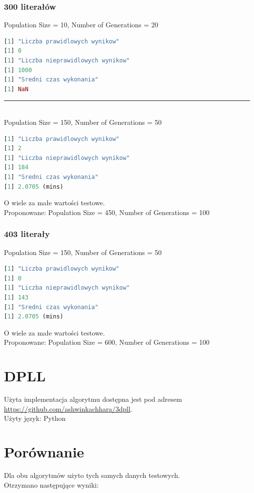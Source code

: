 \documentclass[11pt]{article}
\theoremstyle{note}
\begin{document}
\newpage
\subsubsection{300 literałów}
Population Size = 10, Number of Generations = 20
\begin{lstlisting}[language=R]
[1] "Liczba prawidlowych wynikow"
[1] 0
[1] "Liczba nieprawidlowych wynikow"
[1] 1000
[1] "Sredni czas wykonania"
[1] NaN
\end{lstlisting}
\noindent\rule{13cm}{0.4pt}\\
Population Size = 150, Number of Generations = 50
\begin{lstlisting}[language=R]
[1] "Liczba prawidlowych wynikow"
[1] 2
[1] "Liczba nieprawidlowych wynikow"
[1] 184
[1] "Sredni czas wykonania"
[1] 2.0705 (mins)
\end{lstlisting}
O wiele za małe wartości testowe. \\
Proponowane: Population Size = 450, Number of Generations = 100

\subsubsection{403 literały}
Population Size = 150, Number of Generations = 50
\begin{lstlisting}[language=R]
[1] "Liczba prawidlowych wynikow"
[1] 0
[1] "Liczba nieprawidlowych wynikow"
[1] 143
[1] "Sredni czas wykonania"
[1] 2.0705 (mins)
\end{lstlisting}
O wiele za małe wartości testowe. \\
Proponowane: Population Size = 600, Number of Generations = 100



\newpage
\section{DPLL}
Użyta implementacja algorytmu dostępna jest pod adresem \\\url{https://github.com/ashwinkachhara/3dpll}. \\
Użyty język: Python

\section{Porównanie}
Dla obu algorytmów użyto tych samych danych testowych. \\
Otrzymano następujące wyniki:\\
\end{document}
